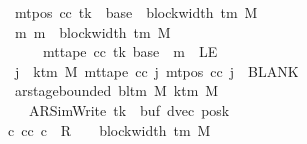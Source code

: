 \begin{isabellebody}
\ \ \ \ \ \ \ \ \ \ \ \ \ \ \ \ \ \ \ \ \ \ \ mt{\isacharunderscore}{\kern0pt}pos\ cc\ tk\ {\isacharequal}{\kern0pt}\ base{\isacharprime}{\kern0pt}\ {\isacharplus}{\kern0pt}\ block{\isacharunderscore}{\kern0pt}width\ {\isacharparenleft}{\kern0pt}{\isasymGamma}{\isacharunderscore}{\kern0pt}tm\ M{\isacharparenright}{\kern0pt}{\isacharsemicolon}{\kern0pt}\isanewline
\ \ \ \ \ \ \ \ \ \ \ \ \ \ \ \ \ \ \ \ \ \ \ {\isasymAnd}m{\isachardot}{\kern0pt}\ m\ {\isasymle}\ block{\isacharunderscore}{\kern0pt}width\ {\isacharparenleft}{\kern0pt}{\isasymGamma}{\isacharunderscore}{\kern0pt}tm\ M{\isacharparenright}{\kern0pt}\isanewline
\ \ \ \ \ \ \ \ \ \ \ \ \ \ \ \ \ \ \ \ \ \ \ \ \ \ {\isasymLongrightarrow}\ mt{\isacharunderscore}{\kern0pt}tape\ cc\ tk\ {\isacharparenleft}{\kern0pt}base{\isacharprime}{\kern0pt}\ {\isacharplus}{\kern0pt}\ m{\isacharparenright}{\kern0pt}\ {\isasymnoteq}\ LE{}{\isacharsemicolon}{\kern0pt}\isanewline
\ \ \ \ \ \ \ \ \ \ \ \ \ \ \ \ \ \ \ \ \ \ \ {\isasymforall}j\ {\isasymge}\ k{\isacharunderscore}{\kern0pt}tm\ M{\isachardot}{\kern0pt}\ mt{\isacharunderscore}{\kern0pt}tape\ cc\ j\ {\isacharparenleft}{\kern0pt}mt{\isacharunderscore}{\kern0pt}pos\ cc\ j{\isacharparenright}{\kern0pt}\ {\isacharequal}{\kern0pt}\ BLANK{}{\isacharsemicolon}{\kern0pt}\isanewline
\ \ \ \ \ \ \ \ \ \ \ \ \ \ \ \ \ \ \ \ \ \ \ ar{\isacharunderscore}{\kern0pt}stage{\isacharunderscore}{\kern0pt}bounded\ {\isacharparenleft}{\kern0pt}bl{\isacharunderscore}{\kern0pt}tm\ M{\isacharparenright}{\kern0pt}\ {\isacharparenleft}{\kern0pt}k{\isacharunderscore}{\kern0pt}tm\ M{\isacharparenright}{\kern0pt}\isanewline
\ \ \ \ \ \ \ \ \ \ \ \ \ \ \ \ \ \ \ \ \ \ \ \ \ {\isacharparenleft}{\kern0pt}AR{\isacharunderscore}{\kern0pt}SimWrite{\isacharcomma}{\kern0pt}\ tk{\isacharcomma}{\kern0pt}\ {}{\isacharcomma}{\kern0pt}\ buf{\isacharcomma}{\kern0pt}\ dvec{\isacharcomma}{\kern0pt}\ posk{\isacharparenright}{\kern0pt}\ {\isasymrbrakk}\isanewline
\ \ \ \ \ \ \ \ \ \ \ \ \ \ \ \ \ \ \ \ \ {\isasymLongrightarrow}\ {\isasymexists}c{\isacharprime}{\kern0pt}{\isacharprime}{\kern0pt}{\isachardot}{\kern0pt}\ {\isacharparenleft}{\kern0pt}cc{\isacharcomma}{\kern0pt}\ c{\isacharprime}{\kern0pt}{\isacharprime}{\kern0pt}{\isacharparenright}{\kern0pt}\ {\isasymin}\ R{\isacharprime}{\kern0pt}\ {\isacharcircum}{\kern0pt}{\isacharcircum}{\kern0pt}\ {\isacharparenleft}{\kern0pt}{}\ {\isacharasterisk}{\kern0pt}\ block{\isacharunderscore}{\kern0pt}width\ {\isacharparenleft}{\kern0pt}{\isasymGamma}{\isacharunderscore}{\kern0pt}tm\ M{\isacharparenright}{\kern0pt}{\isacharparenright}{\kern0pt}\isanewline

\end{isabellebody}
